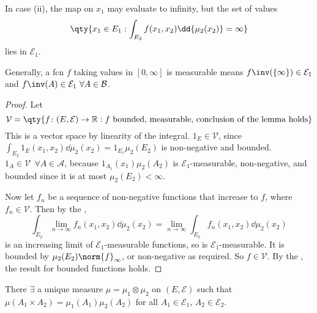 \begin{remark}
	In case (ii), the map on $x_1$ may evaluate to infinity, but the set of values
	\[ \qty{x_1 \in E_1 : \int_{E_2} f(x_1,x_2) \dd{\mu_2(x_2)} = \infty} \]
	lies in $\mathcal E_1$.

	Generally, a fcn $f$ taking values in $[0, \infty]$ is measurable means $f\inv(\{\infty\}) \in \mathcal{E}_1$ and $f\inv(A) \in \mathcal{E}_1 \ \forall A \in \mathcal{B}$.
\end{remark}

\begin{proof}
	Let
	\[ \mathcal V = \qty{f \colon (E,\mathcal E) \to \mathbb R : f \text{ bounded, measurable, conclusion of the lemma holds}} \]
	This is a vector space by linearity of the integral.
	$1_E \in \mathcal V$, since $\int_{E_2} 1_E(x_1,x_2) \dd{\mu_2(x_2)} = 1_{E_1} \mu_2(E_2)$ is non-negative and bounded.
	$1_A \in \mathcal V \ \ \forall A \in \mathcal A$, because $1_{A_1}(x_1) \mu_2(A_2)$ is $\mathcal E_1$-measurable, non-negative, and bounded since it is at most $\mu_2(E_2) < \infty$.

	Now let $f_n$ be a sequence of non-negative functions that increase to $f$, where $f_n \in \mathcal V$.
	Then by the ,
	\[ \int_{E_2} \lim_{n \to \infty} f_n(x_1, x_2) \dd{\mu_2(x_2)} = \lim_{n \to \infty} \int_{E_2} f_n(x_1, x_2) \dd{\mu_2(x_2)} \]
	is an increasing limit of $\mathcal E_1$-measurable functions, so is $\mathcal E_1$-measurable.
	It is bounded by $\mu_2(E_2) \norm{f}_\infty$, or non-negative as required.
	So $f \in \mathcal V$.
	By the , the result for bounded functions holds.

\end{proof}

\begin{theorem}
	There $\exists$ a unique measure $\mu = \mu_1 \otimes \mu_2$ on $(E, \mathcal E)$ such that $\mu(A_1 \times A_2) = \mu_1(A_1) \mu_2(A_2)$ for all $A_1 \in \mathcal E_1$, $A_2 \in \mathcal E_2$.
\end{theorem}

